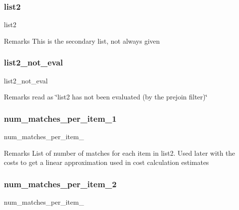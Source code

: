 \subsubsection{\texorpdfstring{list2}{list2}}
{\footnotesize\ttfamily list2}

\begin{DoxyRemark}{Remarks}
This is the secondary list, not always given 
\end{DoxyRemark}
\mbox{\label{classdynamicfilterapp_1_1models_1_1_join_ab92fab596a31b384735eaabb8e3c1a22}} 
\subsubsection{\texorpdfstring{list2\_not\_eval}{list2\_not\_eval}}
{\footnotesize\ttfamily list2\+\_\+not\+\_\+eval}

\begin{DoxyRemark}{Remarks}
read as \char`\"{}list2 has not been evaluated (by the prejoin filter)\char`\"{} 
\end{DoxyRemark}
\mbox{\label{classdynamicfilterapp_1_1models_1_1_join_a8cdba12f778c1ea03188373763c48eb7}} 
\subsubsection{\texorpdfstring{num\_matches\_per\_item\_1}{num\_matches\_per\_item\_1}}
{\footnotesize\ttfamily num\+\_\+matches\+\_\+per\+\_\+item\+\_}

\begin{DoxyRemark}{Remarks}
List of number of matches for each item in list2. Used later with the costs to get a linear approximation used in cost calculation estimates 
\end{DoxyRemark}
\mbox{\label{classdynamicfilterapp_1_1models_1_1_join_a8a9a495627c79f7bc67544c66197dd1c}} 
\subsubsection{\texorpdfstring{num\_matches\_per\_item\_2}{num\_matches\_per\_item\_2}}
{\footnotesize\ttfamily num\+\_\+matches\+\_\+per\+\_\+item\+\_}

